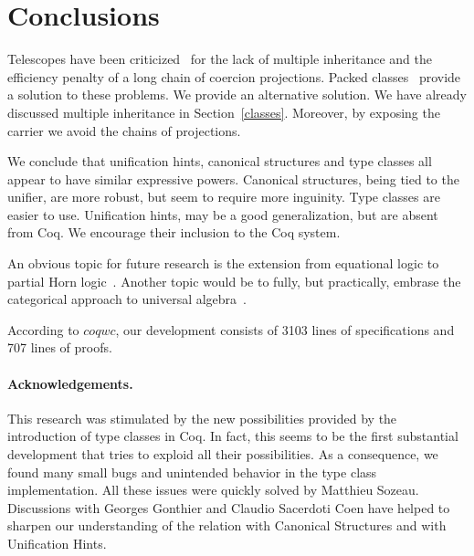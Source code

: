 \documentclass[a4paper,10pt, runningheads]{llncs}
\newcommand{\Varid}[1]{\mathit{#1}}
\begin{document}
\section{Conclusions}
Telescopes have been criticized~\cite{Packed} for the lack of multiple inheritance and
the efficiency penalty of a long chain of coercion projections. Packed classes~\cite{Packed} provide
a solution to these problems. We provide an alternative solution. We have already
discussed multiple inheritance in Section~\ref{classes}. Moreover, by exposing the
carrier we avoid the chains of projections.

We conclude that unification hints, canonical structures and type classes all appear to have
similar expressive powers. Canonical structures, being tied to the unifier, are more robust, but
seem to require more inguinity. Type classes are easier to use. Unification hints, may be a
good generalization, but are absent from Coq. We encourage their inclusion to the
Coq system.

An obvious topic for future research is the extension from equational logic to partial Horn
logic~\cite{palmgren2007partial}. Another topic would be to fully, but practically, embrase the
categorical approach to universal algebra~\cite{pitts2001categorical}.

According to \ensuremath{\Varid{coqwc}}, our development consists of 3103 lines of specifications and 707 lines of
proofs.


% 

\paragraph{Acknowledgements.}
This research was stimulated by the new possibilities provided by the introduction of type classes
in Coq. In fact, this seems to be the first substantial development that tries to exploid all their
possibilities. As a consequence, we found many small bugs and unintended behavior in the type
class implementation. All these issues were quickly solved by Matthieu Sozeau. Discussions with
Georges Gonthier and Claudio Sacerdoti Coen have helped to
sharpen our understanding of the relation with Canonical Structures and with Unification Hints.


\end{document}

